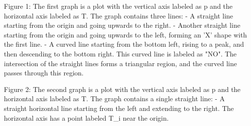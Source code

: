 Figure 1: The first graph is a plot with the vertical axis labeled as p and the horizontal axis labeled as T. The graph contains three lines:
- A straight line starting from the origin and going upwards to the right.
- Another straight line starting from the origin and going upwards to the left, forming an 'X' shape with the first line.
- A curved line starting from the bottom left, rising to a peak, and then descending to the bottom right. This curved line is labeled as "NO".
The intersection of the straight lines forms a triangular region, and the curved line passes through this region.

Figure 2: The second graph is a plot with the vertical axis labeled as p and the horizontal axis labeled as T. The graph contains a single straight line:
- A straight horizontal line starting from the left and extending to the right.
The horizontal axis has a point labeled T_i near the origin.
